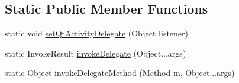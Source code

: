 \subsection*{Static Public Member Functions}
\begin{DoxyCompactItemize}
\item 
static void \hyperlink{classorg_1_1kde_1_1necessitas_1_1origo_1_1_qt_application_afea43576f6f8633639f721ce8bff907e}{set\-Qt\-Activity\-Delegate} (Object listener)
\item 
static Invoke\-Result \hyperlink{classorg_1_1kde_1_1necessitas_1_1origo_1_1_qt_application_a9007552e161bf57f2a75125825d4444b}{invoke\-Delegate} (Object...\-args)
\item 
static Object \hyperlink{classorg_1_1kde_1_1necessitas_1_1origo_1_1_qt_application_a329e95a39e56530f3745aa0d8e057761}{invoke\-Delegate\-Method} (Method m, Object...\-args)
\end{DoxyCompactItemize}
